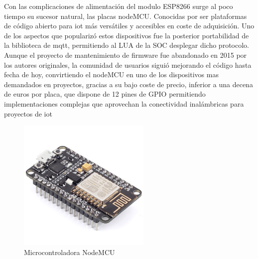 \vspace{1.5cm}

Con las complicaciones de alimentación del modulo ESP8266 surge al poco tiempo su sucesor natural, las placas nodeMCU. Conocidas por ser plataformas de código abierto para \gls{iot} más versátiles y accesibles en coste de adquisición. Uno de los aspectos que popularizó estos dispositivos fue la posterior portabilidad de la biblioteca de \gls{mqtt}, permitiendo al LUA de la SOC desplegar dicho protocolo. Aunque el proyecto de mantenimiento de firmware fue abandonado en 2015 por los autores originales, la comunidad de usuarios siguió mejorando el código hasta fecha de hoy, convirtiendo el nodeMCU en uno de los dispositivos mas demandados en proyectos, gracias a su bajo coste de precio, inferior a una decena de euros por placa, que dispone de 12 pines de GPIO permitiendo implementaciones complejas que aprovechan la conectividad inalámbricas para proyectos de \gls{iot}

\begin{figure}[hbt!]
\centering
\includegraphics[height=2.5in]{figures/nodemcu.jpg}
\caption[captura de una nodeMCU]{Microcontroladora NodeMCU\footnotemark}
\end{figure}
